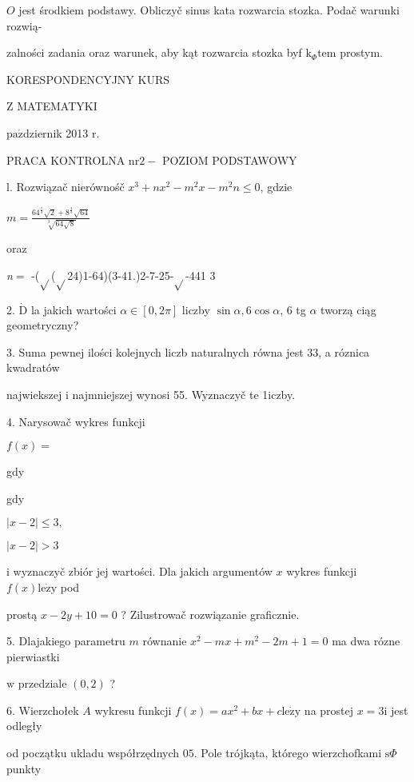 \documentclass[a4paper,12pt]{article}
\begin{document}
$O$ jest środkiem podstawy. Obliczyč sinus kata rozwarcia stozka. Podač warunki rozwią-

zalności zadania oraz warunek, aby kąt rozwarcia stozka byf $\mathrm{k}_{\Phi}\mathrm{t}\mathrm{e}\mathrm{m}$ prostym.





KORESPONDENCYJNY KURS

Z MATEMATYKI

$\mathrm{p}\mathrm{a}\acute{\mathrm{z}}$dziernik 2013 $\mathrm{r}.$

PRACA KONTROLNA $\mathrm{n}\mathrm{r} 2-$ POZIOM PODSTAWOWY

l. Rozwiązač nierównośč $x^{3}+nx^{2}-m^{2}x-m^{2}n\leq 0$, gdzie

$m=\displaystyle \frac{64^{\frac{1}{3}}\sqrt{2}+8^{\frac{1}{3}}\sqrt{64}}{\sqrt[3]{64\sqrt{8}}}$

oraz

{\it n}$=$ -($\sqrt{}$($\sqrt{}$24)1-64)(3-41.)2-7-25-$\sqrt{}$-441 3

2. $\dot{\mathrm{D}}$ la jakich wartości $\alpha\in[0,2\pi]$ liczby $\sin\alpha,  6\cos\alpha$, 6 tg $\alpha$ tworzą ciąg geometryczny?

3. Suma pewnej ilości kolejnych liczb naturalnych równa jest 33, a róznica kwadratów

najwiekszej $\mathrm{i}$ najmniejszej wynosi 55. Wyznaczyč te 1iczby.

4. Narysowač wykres funkcji

$f(x)=$

gdy

gdy

$|x-2|\leq 3,$

$|x-2|>3$

$\mathrm{i}$ wyznaczyč zbiór jej wartości. Dla jakich argumentów $x$ wykres funkcji $f(x) \mathrm{l}\mathrm{e}\dot{\mathrm{z}}\mathrm{y}$ pod

prostą $x-2y+10=0$ ? Zilustrowač rozwiązanie graficznie.

5. Dlajakiego parametru $m$ równanie $x^{2}-mx+m^{2}-2m+1=0$ ma dwa rózne pierwiastki

$\mathrm{w}$ przedziale $(0,2)$ ?

6. Wierzchołek $A$ wykresu funkcji $f(x)=ax^{2}+bx+c\mathrm{l}\mathrm{e}\dot{\mathrm{z}}\mathrm{y}$ na prostej $x=3\mathrm{i}$ jest odległy

od początku ukladu współrzędnych $05$. Pole trójkąta, którego wierzchofkami $\mathrm{s}\Phi$ punkty
\end{document}
